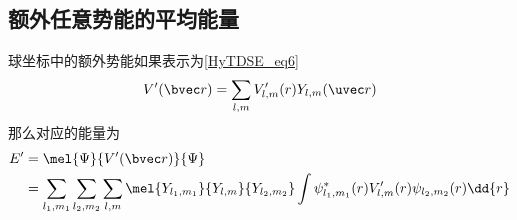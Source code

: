\subsection{额外任意势能的平均能量}
球坐标中的额外势能如果表示为\autoref{HyTDSE_eq6}~
\begin{equation}
V'(\bvec r) = \sum_{l,m} V'_{l,m}(r) Y_{l,m}(\uvec r)
\end{equation}
那么对应的能量为
\begin{equation}\label{Hanaly_eq3}
\begin{aligned}
E' &= \mel{\Psi}{V'(\bvec r)}{\Psi}\\
&= \sum_{l_1,m_1}\sum_{l_2,m_2}\sum_{l,m} \mel{Y_{l_1,m_1}}{Y_{l,m}}{Y_{l_2,m_2}} \int \psi_{l_1,m_1}^*(r) V'_{l,m}(r) \psi_{l_2,m_2}(r) \dd{r}
\end{aligned}
\end{equation}
